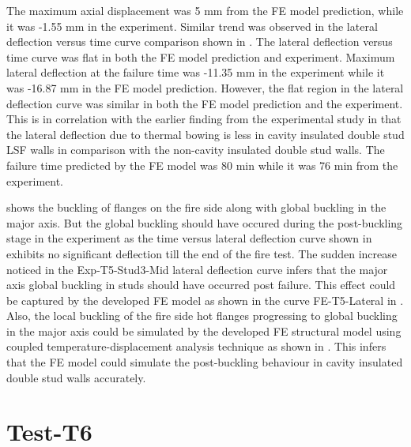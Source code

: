 The maximum axial displacement was 5 mm from the FE model prediction, while it was -1.55 mm in the experiment. Similar trend was observed in the lateral deflection versus time curve comparison shown in . The lateral deflection versus time curve was flat in both the FE model prediction and experiment. Maximum lateral deflection at the failure time was -11.35 mm in the experiment while it was -16.87 mm in the FE model prediction. However, the flat region in the lateral deflection curve was similar in both the FE model prediction and the experiment. This is in correlation with the earlier finding from the experimental study in  that the lateral deflection due to thermal bowing is less in cavity insulated double stud LSF walls in comparison with the non-cavity insulated double stud walls. The failure time predicted by the FE model was 80 min while it was 76 min from the experiment.  

 shows the buckling of flanges on the fire side along with global buckling in the major axis. But the global buckling should have occured during the post-buckling stage in the experiment as the time versus lateral deflection curve shown in  exhibits no significant deflection till the end of the fire test. The sudden increase noticed in the Exp-T5-Stud3-Mid lateral deflection curve infers that the major axis global buckling in studs should have occurred post failure. This effect could be captured by the developed FE model as shown in the curve FE-T5-Lateral in . Also, the local buckling of the fire side hot flanges progressing to global buckling in the major axis could be simulated by the developed FE structural model using coupled temperature-displacement analysis technique as shown in . This infers that the FE model could simulate the post-buckling behaviour in cavity insulated double stud walls accurately.

\section*{Test-T6}

